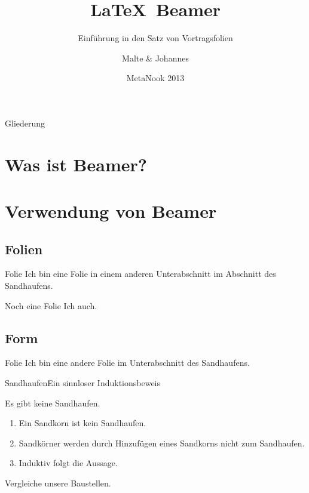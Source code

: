 \documentclass{beamer}
\title{\LaTeX\ Beamer}
\subtitle{Einführung in den Satz von Vortragsfolien}
\author{Malte \& Johannes}
\institute{Uni Lübeck}
\date{MetaNook 2013}
\begin{document}
  \begin{frame}[plain]
    \maketitle
  \end{frame}

  \begin{frame}{Gliederung}
    \tableofcontents
  \end{frame}

  \section{Was ist Beamer?}

  \section{Verwendung von Beamer}

  \subsection{Folien}

  \begin{frame}{Folie}
    Ich bin eine Folie in einem anderen Unterabschnitt im Abschnitt des Sandhaufens.
  \end{frame}

  \begin{frame}{Noch eine Folie}
    Ich auch.
  \end{frame}

  \subsection{Form}

  \begin{frame}{Folie}
    Ich bin eine andere Folie im Unterabschnitt des Sandhaufens.
  \end{frame}

  \begin{frame}{Sandhaufen}{Ein sinnloser Induktionsbeweis}
    \begin{Satz}[Sandhaufensatz]
      Es gibt keine Sandhaufen.
    \end{Satz}

    \begin{Beweis}
      \begin{enumerate}
        \item Ein Sandkorn ist kein Sandhaufen.
        \item Sandkörner werden durch Hinzufügen
          eines Sandkorns nicht zum Sandhaufen.
        \item Induktiv folgt die Aussage. \qedhere
      \end{enumerate}
    \end{Beweis}

    \begin{Beispiel}
      Vergleiche unsere Baustellen.
    \end{Beispiel}
  \end{frame}
\end{document}
